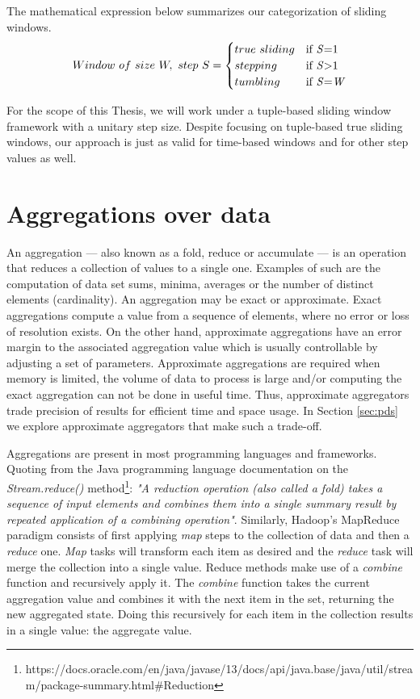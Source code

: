 The mathematical expression below summarizes our categorization of sliding windows.
\begin{equation} 
  Window \,\, of \,\, size \,\, W, \,\, step \,\, S =
    \begin{cases}
      true \,\, sliding & \text{if \textit{S}=1}\\
      stepping & \text{if \textit{S}>1}\\
      tumbling & \text{if \textit{S}=\textit{W}}
    \end{cases}
\end{equation}

For the scope of this Thesis, we will work under a tuple-based sliding window framework with a unitary step size. Despite focusing on tuple-based true sliding windows, our approach is just as valid for time-based windows and for other step values as well.

\section{Aggregations over data} \label{sec:aggregations}

An aggregation --- also known as a fold, reduce or accumulate --- is an operation that reduces a collection of values to a single one. Examples of such are the computation of data set sums, minima, averages or the number of distinct elements (cardinality). An aggregation may be exact or approximate. Exact aggregations compute a value from a sequence of elements, where no error or loss of resolution exists. On the other hand, approximate aggregations have an error margin to the associated aggregation value which is usually controllable by adjusting a set of parameters. 
Approximate aggregations are required when memory is limited, the volume of data to process is large and/or computing the exact aggregation can not be done in useful time. Thus, approximate aggregators trade precision of results for efficient time and space usage. In Section \ref{sec:pds} we explore approximate aggregators that make such a trade-off.

Aggregations are present in most programming languages and frameworks. Quoting from the Java programming language documentation on the \textit{Stream.reduce()} method\footnote{https://docs.oracle.com/en/java/javase/13/docs/api/java.base/java/util/stream/package-summary.html\#Reduction}: 
\textit{"A reduction operation (also called a fold) takes a sequence of input elements and combines them into a single summary result by repeated application of a combining operation"}. Similarly, Hadoop's MapReduce paradigm consists of first applying \textit{map} steps to the collection of data and then a \textit{reduce} one. \textit{Map} tasks will transform each item as desired and the \textit{reduce} task will merge the collection into a single value. Reduce methods make use of a \textit{combine} function and recursively apply it. The \textit{combine} function takes the current aggregation value and combines it with the next item in the set, returning the new aggregated state. Doing this recursively for each item in the collection results in a single value: the aggregate value.

